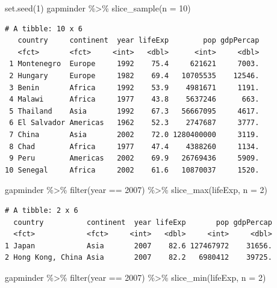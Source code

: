 \documentclass[
  portuguese,
  letterpaper,
  DIV=11,
  numbers=noendperiod]{scrreprt}
\newenvironment{Shaded}{\begin{snugshade}}{\end{snugshade}}
\newcommand{\AttributeTok}[1]{\textcolor[rgb]{0.40,0.45,0.13}{#1}}
\newcommand{\DecValTok}[1]{\textcolor[rgb]{0.68,0.00,0.00}{#1}}
\newcommand{\FunctionTok}[1]{\textcolor[rgb]{0.28,0.35,0.67}{#1}}
\newcommand{\NormalTok}[1]{\textcolor[rgb]{0.00,0.23,0.31}{#1}}
\newcommand{\SpecialCharTok}[1]{\textcolor[rgb]{0.37,0.37,0.37}{#1}}
\theoremstyle{definition}
\theoremstyle{remark}
\begin{document}
\begin{Shaded}
\begin{Highlighting}[]
\FunctionTok{set.seed}\NormalTok{(}\DecValTok{1}\NormalTok{)}
\NormalTok{gapminder }\SpecialCharTok{\%\textgreater{}\%} 
  \FunctionTok{slice\_sample}\NormalTok{(}\AttributeTok{n =} \DecValTok{10}\NormalTok{)}
\end{Highlighting}
\end{Shaded}

\begin{verbatim}
# A tibble: 10 x 6
   country     continent  year lifeExp        pop gdpPercap
   <fct>       <fct>     <int>   <dbl>      <int>     <dbl>
 1 Montenegro  Europe     1992    75.4     621621     7003.
 2 Hungary     Europe     1982    69.4   10705535    12546.
 3 Benin       Africa     1992    53.9    4981671     1191.
 4 Malawi      Africa     1977    43.8    5637246      663.
 5 Thailand    Asia       1992    67.3   56667095     4617.
 6 El Salvador Americas   1962    52.3    2747687     3777.
 7 China       Asia       2002    72.0 1280400000     3119.
 8 Chad        Africa     1977    47.4    4388260     1134.
 9 Peru        Americas   2002    69.9   26769436     5909.
10 Senegal     Africa     2002    61.6   10870037     1520.
\end{verbatim}

\begin{Shaded}
\begin{Highlighting}[]
\NormalTok{gapminder }\SpecialCharTok{\%\textgreater{}\%} 
  \FunctionTok{filter}\NormalTok{(year }\SpecialCharTok{==} \DecValTok{2007}\NormalTok{) }\SpecialCharTok{\%\textgreater{}\%} 
  \FunctionTok{slice\_max}\NormalTok{(lifeExp, }\AttributeTok{n =} \DecValTok{2}\NormalTok{)}
\end{Highlighting}
\end{Shaded}

\begin{verbatim}
# A tibble: 2 x 6
  country          continent  year lifeExp       pop gdpPercap
  <fct>            <fct>     <int>   <dbl>     <int>     <dbl>
1 Japan            Asia       2007    82.6 127467972    31656.
2 Hong Kong, China Asia       2007    82.2   6980412    39725.
\end{verbatim}

\begin{Shaded}
\begin{Highlighting}[]
\NormalTok{gapminder }\SpecialCharTok{\%\textgreater{}\%} 
  \FunctionTok{filter}\NormalTok{(year }\SpecialCharTok{==} \DecValTok{2007}\NormalTok{) }\SpecialCharTok{\%\textgreater{}\%} 
  \FunctionTok{slice\_min}\NormalTok{(lifeExp, }\AttributeTok{n =} \DecValTok{2}\NormalTok{)}
\end{Highlighting}
\end{Shaded}
\end{document}
